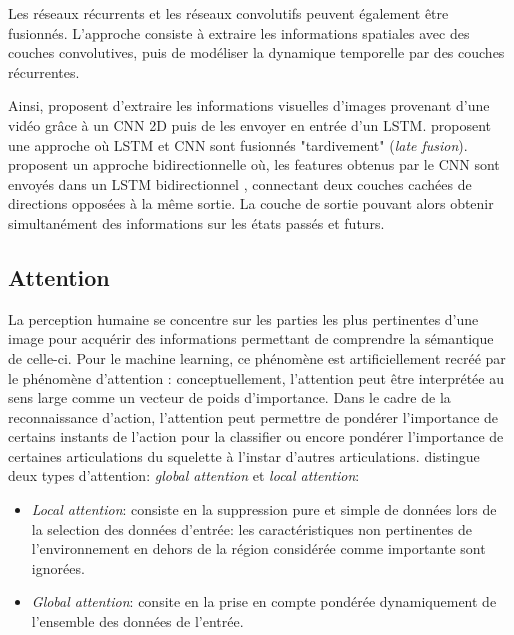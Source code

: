 Les réseaux récurrents et les réseaux convolutifs peuvent également être fusionnés. L'approche consiste à extraire les informations spatiales avec des couches convolutives, puis de modéliser la dynamique temporelle par des couches récurrentes.

Ainsi, \cite{donahue2015long} proposent d'extraire les informations visuelles d'images provenant d'une vidéo grâce à un CNN 2D puis de les envoyer en entrée d'un LSTM.
\cite{li2017skeleton} proposent une approche où LSTM et CNN sont fusionnés "tardivement" (\textit{late fusion}). \cite{ullah2017action} proposent un approche bidirectionnelle où, les features obtenus par le CNN sont envoyés dans un LSTM bidirectionnel \cite{Schuster97bidirectionalrecurrent}, connectant deux couches cachées de directions opposées à la même sortie. La couche de sortie pouvant alors obtenir simultanément des informations sur les états passés et futurs.

\subsection{Attention}
La perception humaine se concentre sur les parties les plus pertinentes d'une image pour acquérir des informations permettant de comprendre la sémantique de celle-ci. Pour le machine learning, ce phénomène est artificiellement recréé  par le phénomène d'attention \cite{bahdanau2014neural,2017arXiv170603762V}: conceptuellement, l'attention peut être interprétée au sens large comme un vecteur de poids d'importance. 
Dans le cadre de la reconnaissance d'action, l'attention peut permettre de pondérer l'importance de certains instants de l'action pour la classifier ou encore pondérer l'importance de certaines articulations du squelette à l'instar d'autres articulations.
\cite{luong2015effective} distingue deux types d'attention: \textit{global attention} et \textit{local attention}:
 \begin{itemize}
     \item \textit{Local attention}: consiste en la suppression pure et simple de données lors de la selection des données d'entrée: les caractéristiques non pertinentes de l'environnement en dehors de la région considérée comme importante sont ignorées.
     \item \textit{Global attention}: consite en la prise en compte pondérée dynamiquement de l'ensemble des données de l'entrée.
 \end{itemize}
 
 
